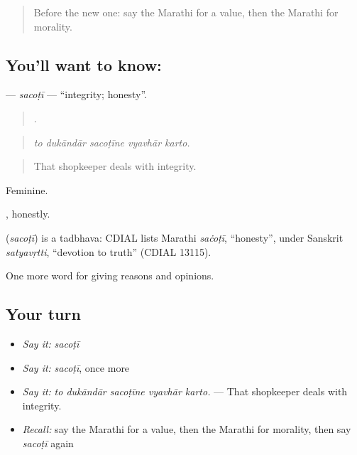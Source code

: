 \label{lesson:MR-C366-sacoti}



\begin{quote}
Before the new one: say the Marathi for a value, then the Marathi for morality.
\end{quote}

\subsection*{You'll want to know: }
\textbf{} — \emph{sacoṭī} — \textquotedblleft{}integrity; honesty\textquotedblright{}.

\begin{quote}
    .
\end{quote}

\begin{quote}
\emph{to dukāndār sacoṭīne vyavhār karto.}
\end{quote}

\begin{quote}
That shopkeeper deals with integrity.
\end{quote}

Feminine.

, honestly.

\begin{cousinweb}
\textbf{} (\emph{sacoṭī}) is a tadbhava: CDIAL lists Marathi \emph{saċoṭī}, \textquotedblleft{}honesty\textquotedblright{}, under Sanskrit \emph{satyavṛtti}, \textquotedblleft{}devotion to truth\textquotedblright{} (CDIAL 13115).
\end{cousinweb}

\begin{grammarlens}[title={What you've built}]
One more word for giving reasons and opinions.
\end{grammarlens}

\subsection*{Your turn}
\begin{itemize}
\raggedright
  \item \emph{Say it:} \emph{sacoṭī}
  \item \emph{Say it:} \emph{sacoṭī}, once more
  \item \emph{Say it:} \emph{to dukāndār sacoṭīne vyavhār karto.} — That shopkeeper deals with integrity.
  \item \emph{Recall:} say the Marathi for a value, then the Marathi for morality, then say \emph{sacoṭī} again
\end{itemize}

